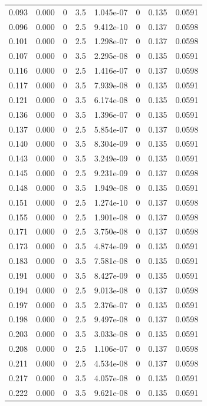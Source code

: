\documentclass[preview]{standalone}
\begin{document}
{{\begin{tabular}{L{1.2cm}C{1.2cm} C{0.3cm}C{0.5cm} C{1.4cm}C{1.4cm} C{1.4cm}C{1.4cm}}
  0.093  &  0.000  & 0     & 3.5 &  1.045e-07  & 0  & 0.135 &  0.0591   \\ 
  0.096  &  0.000  & 0     & 2.5 &  9.412e-10  & 0  & 0.137 &  0.0598   \\ 
  0.101  &  0.000  & 0     & 2.5 &  1.298e-07  & 0  & 0.137 &  0.0598   \\ 
  0.107  &  0.000  & 0     & 3.5 &  2.295e-08  & 0  & 0.135 &  0.0591   \\ 
  0.116  &  0.000  & 0     & 2.5 &  1.416e-07  & 0  & 0.137 &  0.0598   \\ 
  0.117  &  0.000  & 0     & 3.5 &  7.939e-08  & 0  & 0.135 &  0.0591   \\ 
  0.121  &  0.000  & 0     & 3.5 &  6.174e-08  & 0  & 0.135 &  0.0591   \\ 
  0.136  &  0.000  & 0     & 3.5 &  1.396e-07  & 0  & 0.135 &  0.0591   \\ 
  0.137  &  0.000  & 0     & 2.5 &  5.854e-07  & 0  & 0.137 &  0.0598   \\ 
  0.140  &  0.000  & 0     & 3.5 &  8.304e-09  & 0  & 0.135 &  0.0591   \\ 
  0.143  &  0.000  & 0     & 3.5 &  3.249e-09  & 0  & 0.135 &  0.0591   \\ 
  0.145  &  0.000  & 0     & 2.5 &  9.231e-09  & 0  & 0.137 &  0.0598   \\ 
  0.148  &  0.000  & 0     & 3.5 &  1.949e-08  & 0  & 0.135 &  0.0591   \\ 
  0.151  &  0.000  & 0     & 2.5 &  1.274e-10  & 0  & 0.137 &  0.0598   \\ 
  0.155  &  0.000  & 0     & 2.5 &  1.901e-08  & 0  & 0.137 &  0.0598   \\ 
  0.171  &  0.000  & 0     & 2.5 &  3.750e-08  & 0  & 0.137 &  0.0598   \\ 
  0.173  &  0.000  & 0     & 3.5 &  4.874e-09  & 0  & 0.135 &  0.0591   \\ 
  0.183  &  0.000  & 0     & 3.5 &  7.581e-08  & 0  & 0.135 &  0.0591   \\ 
  0.191  &  0.000  & 0     & 3.5 &  8.427e-09  & 0  & 0.135 &  0.0591   \\ 
  0.194  &  0.000  & 0     & 2.5 &  9.013e-08  & 0  & 0.137 &  0.0598   \\ 
  0.197  &  0.000  & 0     & 3.5 &  2.376e-07  & 0  & 0.135 &  0.0591   \\ 
  0.198  &  0.000  & 0     & 2.5 &  9.497e-08  & 0  & 0.137 &  0.0598   \\ 
  0.203  &  0.000  & 0     & 3.5 &  3.033e-08  & 0  & 0.135 &  0.0591   \\ 
  0.208  &  0.000  & 0     & 2.5 &  1.106e-07  & 0  & 0.137 &  0.0598   \\ 
  0.211  &  0.000  & 0     & 2.5 &  4.534e-08  & 0  & 0.137 &  0.0598   \\ 
  0.217  &  0.000  & 0     & 3.5 &  4.057e-08  & 0  & 0.135 &  0.0591   \\ 
  0.222  &  0.000  & 0     & 3.5 &  9.621e-08  & 0  & 0.135 &  0.0591   \\ 
\hline 
\end{tabular} 

}}
\end{document}
